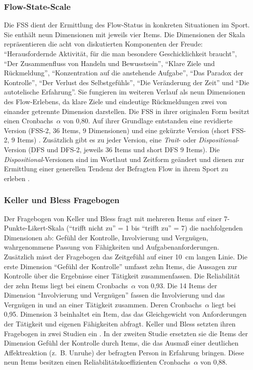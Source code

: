 \subsubsection{Flow-State-Scale}

Die \ac{FSS} dient der Ermittlung des Flow-Status in konkreten Situationen im Sport. Sie enthält neun Dimensionen mit jeweils vier Items. Die Dimensionen der Skala repräsentieren die acht von \citet[S. 73-101]{Csikszentmihalyi1992} diskutierten Komponenten der Freude: "`Herausfordernde Aktivität, für die man besondere Geschicklichkeit braucht"', "`Der Zusammenfluss von Handeln und Bewusstsein"', "`Klare Ziele und Rückmeldung"', "`Konzentration auf die anstehende Aufgabe"', "`Das Paradox der Kontrolle"', "`Der Verlust des Selbstgefühls"', "`Die Veränderung der Zeit"' und "`Die autotelische Erfahrung"'. Sie fungieren im weiteren Verlauf als neun Dimensionen des Flow-Erlebens, da klare Ziele und eindeutige Rückmeldungen zwei von einander getrennte Dimension darstellen. Die \ac{FSS} in ihrer originalen Form besitzt einen Cronbachs~$\alpha$ von 0,80. Auf ihrer Grundlage entstanden eine revidierte Version (FSS-2, 36 Items, 9 Dimensionen) und eine gekürzte Version (short FSS-2, 9 Items) \citep[vgl.][]{Jackson2002, Jackson2008}. Zusätzlich gibt es zu jeder Version, eine \emph{Trait}- oder \emph{Dispositional}-Version (\acs{DFS} und DFS-2, jeweils 36 Items und short DFS 9 Items). Die \emph{Dispositional}-Versionen sind im Wortlaut und Zeitform geändert und dienen zur Ermittlung einer generellen Tendenz der Befragten Flow in ihrem Sport zu erleben \citep[vgl.][S.~356]{Jackson1998}.

\subsubsection{Keller und Bless Fragebogen}

Der Fragebogen von Keller und Bless fragt mit mehreren Items auf einer 7-Punkte-Likert-Skala ("`trifft nicht zu"' = 1 bis "`trifft zu"' = 7) die nachfolgenden Dimensionen ab: Gefühl der Kontrolle, Involvierung und Vergnügen, wahrgenommene Passung von Fähigkeiten und Aufgabenanforderungen. Zusätzlich misst der Fragebogen das Zeitgefühl auf einer 10~cm langen Linie. Die erste Dimension "`Gefühl der Kontrolle"' umfasst zehn Items, die Aussagen zur Kontrolle über die Ergebnisse einer Tätigkeit zusammenfassen. Die Reliabilität der zehn Items liegt bei einem Cronbachs~$\alpha$ von 0,93. Die 14 Items der Dimension "`Involvierung und Vergnügen"' fassen die Involvierung und das Vergnügen in und an einer Tätigkeit zusammen. Deren Cronbachs~$\alpha$ liegt bei 0,95. Dimension 3 beinhaltet ein Item, das das Gleichgewicht von Anforderungen der Tätigkeit und eigenen Fähigkeiten abfragt. Keller und Bless setzten ihren Fragebogen in zwei Studien ein \citep{Keller2008}. In der zweiten Studie ersetzten sie die Items der Dimension Gefühl der Kontrolle durch Items, die das Ausmaß einer deutlichen Affektreaktion (z.~B. Unruhe) der befragten Person in Erfahrung bringen. Diese neun Items besitzen einen Reliabilitätskoeffizienten Cronbachs~$\alpha$ von 0,88.

